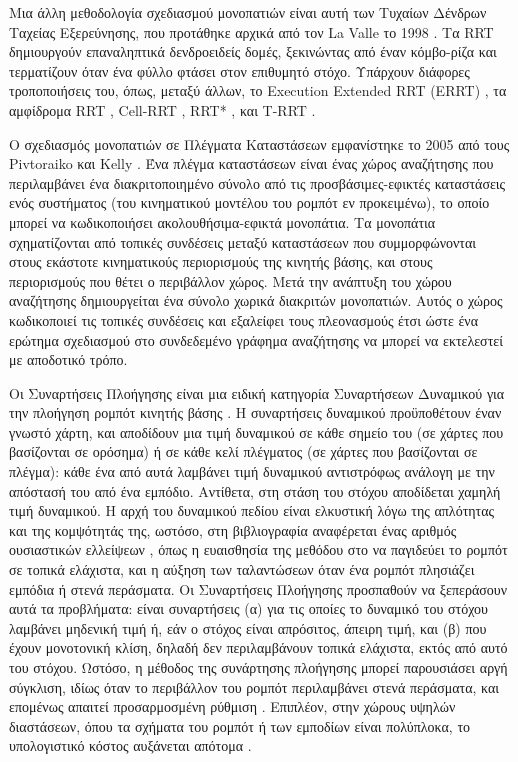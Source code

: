 Μια άλλη μεθοδολογία σχεδιασμού μονοπατιών είναι αυτή των Τυχαίων Δένδρων
Ταχείας Εξερεύνησης, που προτάθηκε αρχικά από τον La Valle το 1998
\cite{Lavalle1998}. Τα RRT δημιουργούν επαναληπτικά δενδροειδείς δομές,
ξεκινώντας από έναν κόμβο-ρίζα και τερματίζουν όταν ένα φύλλο φτάσει στον
επιθυμητό στόχο. Υπάρχουν διάφορες τροποποιήσεις του, όπως, μεταξύ άλλων, το
Execution Extended RRT (ERRT) \cite{Bruce}, τα αμφίδρομα RRT \cite{Martin2007},
Cell-RRT \cite{Guitton2009}, RRT* \cite{Karaman2010}, και T-RRT
\cite{Jaillet2010}.

Ο σχεδιασμός μονοπατιών σε Πλέγματα Καταστάσεων εμφανίστηκε το 2005 από τους
Pivtoraiko και Kelly \cite{MikhailPivtoraiko2005}. Ένα πλέγμα καταστάσεων είναι
ένας χώρος αναζήτησης που περιλαμβάνει ένα διακριτοποιημένο σύνολο από τις
προσβάσιμες-εφικτές καταστάσεις ενός συστήματος (του κινηματικού μοντέλου του
ρομπότ εν προκειμένω), το οποίο μπορεί να κωδικοποιήσει ακολουθήσιμα-εφικτά
μονοπάτια. Τα μονοπάτια σχηματίζονται από τοπικές συνδέσεις μεταξύ καταστάσεων
που συμμορφώνονται στους εκάστοτε κινηματικούς περιορισμούς της κινητής βάσης,
και στους περιορισμούς που θέτει ο περιβάλλον χώρος. Μετά την ανάπτυξη του χώρου
αναζήτησης δημιουργείται ένα σύνολο χωρικά διακριτών μονοπατιών. Αυτός ο χώρος
κωδικοποιεί τις τοπικές συνδέσεις και εξαλείφει τους πλεονασμούς έτσι ώστε ένα
ερώτημα σχεδιασμού στο συνδεδεμένο γράφημα αναζήτησης να μπορεί να εκτελεστεί
με αποδοτικό τρόπο.

Οι Συναρτήσεις Πλοήγησης είναι μια ειδική κατηγορία Συναρτήσεων Δυναμικού για
την πλοήγηση ρομπότ κινητής βάσης \cite{Latombe1991}. Η συναρτήσεις δυναμικού
προϋποθέτουν έναν γνωστό χάρτη, και αποδίδουν μια τιμή δυναμικού σε κάθε σημείο
του (σε χάρτες που βασίζονται σε ορόσημα) ή σε κάθε κελί πλέγματος (σε χάρτες
που βασίζονται σε πλέγμα): κάθε ένα από αυτά λαμβάνει τιμή δυναμικού αντιστρόφως
ανάλογη με την απόστασή του από ένα εμπόδιο. Αντίθετα, στη στάση του στόχου
αποδίδεται χαμηλή τιμή δυναμικού. Η αρχή του δυναμικού πεδίου είναι ελκυστική
λόγω της απλότητας και της κομψότητάς της, ωστόσο, στη βιβλιογραφία αναφέρεται
ένας αριθμός ουσιαστικών ελλείψεων \cite{Koren}\cite{Ge2000}, όπως η
ευαισθησία της μεθόδου στο να παγιδεύει το ρομπότ σε τοπικά ελάχιστα, και η
αύξηση των ταλαντώσεων όταν ένα ρομπότ πλησιάζει εμπόδια ή στενά περάσματα. Οι
Συναρτήσεις Πλοήγησης προσπαθούν να ξεπεράσουν αυτά τα προβλήματα: είναι
συναρτήσεις (α) για τις οποίες το δυναμικό του στόχου λαμβάνει μηδενική τιμή ή,
εάν ο στόχος είναι απρόσιτος, άπειρη τιμή, και (β) που έχουν μονοτονική κλίση,
δηλαδή δεν περιλαμβάνουν τοπικά ελάχιστα, εκτός από αυτό του στόχου. Ωστόσο, η
μέθοδος της συνάρτησης πλοήγησης μπορεί παρουσιάσει αργή σύγκλιση, ιδίως όταν
το περιβάλλον του ρομπότ περιλαμβάνει στενά περάσματα, και επομένως απαιτεί
προσαρμοσμένη ρύθμιση \cite{Kowalczyk2019}. Επιπλέον, στην χώρους υψηλών
διαστάσεων, όπου τα σχήματα του ρομπότ ή των εμποδίων είναι πολύπλοκα, το
υπολογιστικό κόστος αυξάνεται απότομα \cite{Park2016}.

